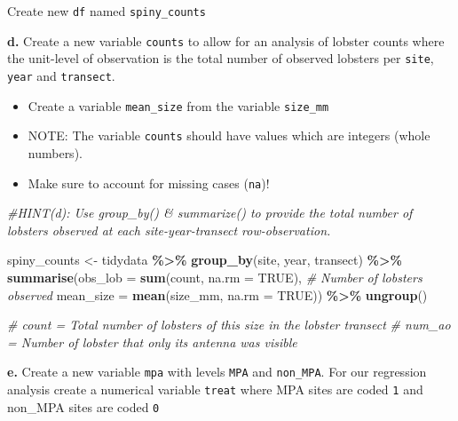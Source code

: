 \documentclass[
]{article}
\newenvironment{Shaded}{\begin{snugshade}}{\end{snugshade}}
\newcommand{\AttributeTok}[1]{\textcolor[rgb]{0.13,0.29,0.53}{#1}}
\newcommand{\CommentTok}[1]{\textcolor[rgb]{0.56,0.35,0.01}{\textit{#1}}}
\newcommand{\ConstantTok}[1]{\textcolor[rgb]{0.56,0.35,0.01}{#1}}
\newcommand{\FunctionTok}[1]{\textcolor[rgb]{0.13,0.29,0.53}{\textbf{#1}}}
\newcommand{\NormalTok}[1]{#1}
\newcommand{\OtherTok}[1]{\textcolor[rgb]{0.56,0.35,0.01}{#1}}
\newcommand{\SpecialCharTok}[1]{\textcolor[rgb]{0.81,0.36,0.00}{\textbf{#1}}}
\providecommand{\tightlist}{%
  \setlength{\itemsep}{0pt}\setlength{\parskip}{0pt}}
\begin{document}
Create new \texttt{df} named \texttt{spiny\_counts}

\textbf{d.} Create a new variable \texttt{counts} to allow for an
analysis of lobster counts where the unit-level of observation is the
total number of observed lobsters per \texttt{site}, \texttt{year} and
\texttt{transect}.

\begin{itemize}
\tightlist
\item
  Create a variable \texttt{mean\_size} from the variable
  \texttt{size\_mm}
\item
  NOTE: The variable \texttt{counts} should have values which are
  integers (whole numbers).
\item
  Make sure to account for missing cases (\texttt{na})!
\end{itemize}

\begin{Shaded}
\begin{Highlighting}[]
\CommentTok{\#HINT(d): Use \textasciigrave{}group\_by()\textasciigrave{} \& \textasciigrave{}summarize()\textasciigrave{} to provide the total number of lobsters observed at each site{-}year{-}transect row{-}observation. }

\NormalTok{spiny\_counts }\OtherTok{\textless{}{-}}\NormalTok{ tidydata }\SpecialCharTok{\%\textgreater{}\%} 
    \FunctionTok{group\_by}\NormalTok{(site, year, transect) }\SpecialCharTok{\%\textgreater{}\%} 
    \FunctionTok{summarise}\NormalTok{(}\AttributeTok{obs\_lob =} \FunctionTok{sum}\NormalTok{(count, }\AttributeTok{na.rm =} \ConstantTok{TRUE}\NormalTok{), }\CommentTok{\# Number of lobsters observed }
              \AttributeTok{mean\_size =} \FunctionTok{mean}\NormalTok{(size\_mm, }\AttributeTok{na.rm =} \ConstantTok{TRUE}\NormalTok{)) }\SpecialCharTok{\%\textgreater{}\%} 
    \FunctionTok{ungroup}\NormalTok{()}

\CommentTok{\# \textasciigrave{}count\textasciigrave{} = Total number of lobsters of this size in the lobster transect   }
\CommentTok{\# \textasciigrave{}num\_ao\textasciigrave{} = Number of lobster that only its antenna was visible}
\end{Highlighting}
\end{Shaded}

\textbf{e.} Create a new variable \texttt{mpa} with levels \texttt{MPA}
and \texttt{non\_MPA}. For our regression analysis create a numerical
variable \texttt{treat} where MPA sites are coded \texttt{1} and
non\_MPA sites are coded \texttt{0}
\end{document}
